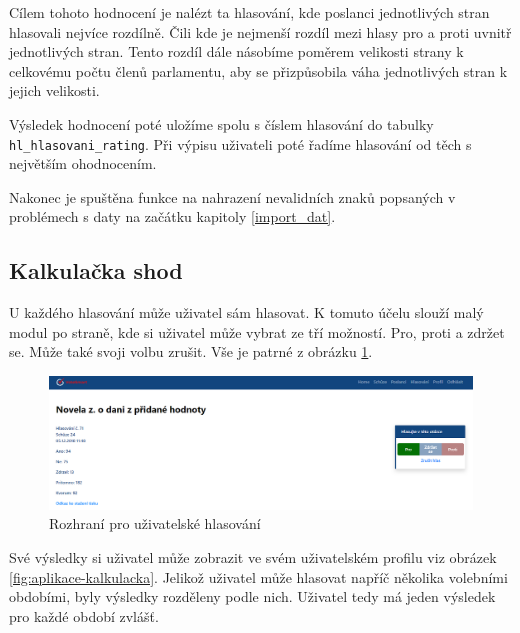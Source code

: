 \par Cílem tohoto hodnocení je nalézt ta hlasování, kde poslanci jednotlivých stran hlasovali nejvíce rozdílně. Čili kde je nejmenší rozdíl mezi hlasy pro a proti uvnitř jednotlivých stran. Tento rozdíl dále násobíme poměrem velikosti strany k celkovému počtu členů parlamentu, aby se přizpůsobila váha jednotlivých stran k jejich velikosti.  

\par Výsledek hodnocení poté uložíme spolu s číslem hlasování do tabulky \texttt{hl\_hlasovani\_rating}. Při výpisu uživateli poté řadíme hlasování od těch s největším ohodnocením.\\

\par Nakonec je spuštěna funkce na nahrazení nevalidních znaků popsaných v problémech s daty na začátku kapitoly \ref{import_dat}. 

\subsection{Kalkulačka shod}
U každého hlasování může uživatel sám hlasovat. K tomuto účelu slouží malý modul po straně, kde si uživatel může vybrat ze tří možností. Pro, proti a zdržet se. Může také svoji volbu zrušit. Vše je patrné z obrázku \ref{fig:aplikace-hlasovani}.

\begin{figure}
    \centering
    \includegraphics[width=1\textwidth]{obrazky-figures/aplikace-hlasovani.png}
    \caption{Rozhraní pro uživatelské hlasování}
    \label{fig:aplikace-hlasovani}
\end{figure}

\par Své výsledky si uživatel může zobrazit ve svém uživatelském profilu viz obrázek \ref{fig:aplikace-kalkulacka}. Jelikož uživatel může hlasovat napříč několika volebními obdobími, byly výsledky rozděleny podle nich. Uživatel tedy má jeden výsledek pro každé období zvlášť. 


